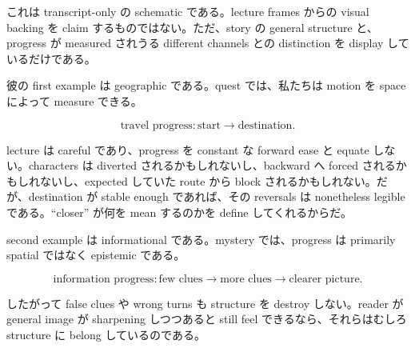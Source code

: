 \begin{figure}
\centering
{}
\end{figure}

これは transcript-only の schematic である。lecture frames からの visual backing を claim するものではない。ただ、story の general structure と、progress が measured されうる different channels との distinction を display しているだけである。

彼の first example は geographic である。quest では、私たちは motion を space によって measure できる。

\begin{equation}
\text{travel progress} : \text{start} \to \text{destination}.
\end{equation}

lecture は careful であり、progress を constant な forward ease と equate しない。characters は diverted されるかもしれないし、backward へ forced されるかもしれないし、expected していた route から block されるかもしれない。だが、destination が stable enough であれば、その reversals は nonetheless legible である。``closer'' が何を mean するのかを define してくれるからだ。

second example は informational である。mystery では、progress は primarily spatial ではなく epistemic である。

\begin{equation}
\text{information progress} : \text{few clues} \to \text{more clues} \to \text{clearer picture}.
\end{equation}

したがって false clues や wrong turns も structure を destroy しない。reader が general image が sharpening しつつあると still feel できるなら、それらはむしろ structure に belong しているのである。

